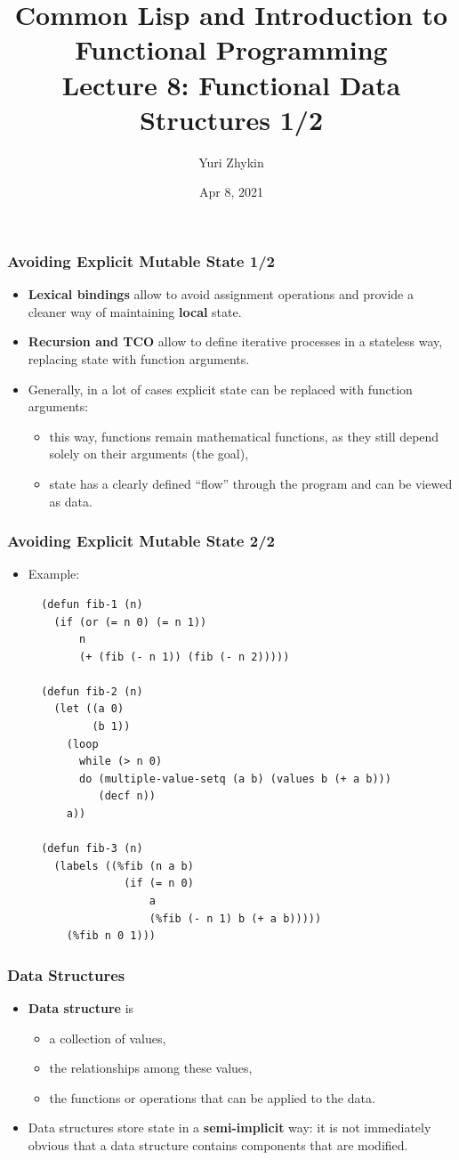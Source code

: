 \documentclass{beamer}
\title{
  Common Lisp and Introduction to Functional Programming \\
  Lecture 8: Functional Data Structures 1/2
}
\author{Yuri Zhykin}
\date{Apr 8, 2021}
\begin{document}
\frame{\titlepage}

\begin{frame}[fragile]
  \frametitle{Avoiding Explicit Mutable State 1/2}
  \begin{itemize}
  \item \textbf{Lexical bindings} allow to avoid assignment operations and
    provide a cleaner way of maintaining \textbf{local} state.
  \item \textbf{Recursion and TCO} allow to define iterative processes in a
    stateless way, replacing state with function arguments.
  \item Generally, in a lot of cases explicit state can be replaced with
    function arguments:
    \begin{itemize}
    \item this way, functions remain mathematical functions, as they still
      depend solely on their arguments (the goal),
    \item state has a clearly defined ``flow'' through the program and can be
      viewed as data.
    \end{itemize}
  \end{itemize}
\end{frame}

\begin{frame}[fragile]
  \frametitle{Avoiding Explicit Mutable State 2/2}
  \begin{itemize}
  \item Example:
\begin{verbatim}
  (defun fib-1 (n)
    (if (or (= n 0) (= n 1))
        n
        (+ (fib (- n 1)) (fib (- n 2)))))

  (defun fib-2 (n)
    (let ((a 0)
          (b 1))
      (loop 
        while (> n 0)
        do (multiple-value-setq (a b) (values b (+ a b)))
           (decf n))
      a))

  (defun fib-3 (n)
    (labels ((%fib (n a b)
               (if (= n 0)
                   a
                   (%fib (- n 1) b (+ a b)))))
      (%fib n 0 1)))
\end{verbatim}
  \end{itemize}
\end{frame}

\begin{frame}[fragile]
  \frametitle{Data Structures}
  \begin{itemize}
  \item \textbf{Data structure} is
    \begin{itemize}
    \item a collection of values,
    \item the relationships among these values,
    \item the functions or operations that can be applied to the data.
    \end{itemize}
  \item Data structures store state in a \textbf{semi-implicit} way: it is not
    immediately obvious that a data structure contains components that are
    modified.
  \end{itemize}
\end{frame}
\end{document}
